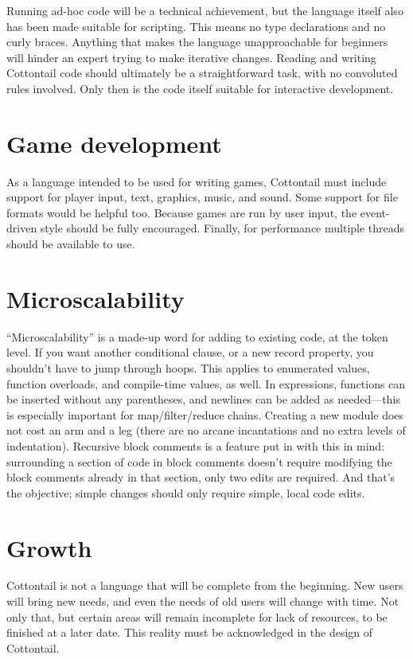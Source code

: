 Running ad-hoc code will be a technical achievement, but the language
itself also has been made suitable for scripting. This means no type
declarations and no curly braces. Anything that makes the language
unapproachable for beginners will hinder an expert trying to make
iterative changes. Reading and writing Cottontail code should
ultimately be a straightforward task, with no convoluted rules
involved. Only then is the code itself suitable for interactive
development.


\section{Game development}

As a language intended to be used for writing games, Cottontail must
include support for player input, text, graphics, music, and sound.
Some support for file formats would be helpful too. Because games are
run by user input, the event-driven style should be fully encouraged.
Finally, for performance multiple threads should be available to use.


\section{Microscalability}

``Microscalability'' is a made-up word for adding to existing code, at
the token level. If you want another conditional clause, or a new
record property, you shouldn't have to jump through hoops. This
applies to enumerated values, function overloads, and compile-time
values, as well. In expressions, functions can be inserted without any
parentheses, and newlines can be added as needed---this is especially
important for map/filter/reduce chains. Creating a new module does not
cost an arm and a leg (there are no arcane incantations and no extra
levels of indentation). Recursive block comments is a feature put in
with this in mind: surrounding a section of code in block comments
doesn't require modifying the block comments already in that section,
only two edits are required. And that's the objective; simple changes
should only require simple, local code edits.


\section{Growth}

Cottontail is not a language that will be complete from the beginning.
New users will bring new needs, and even the needs of old users will
change with time. Not only that, but certain areas will remain
incomplete for lack of resources, to be finished at a later date. This
reality must be acknowledged in the design of Cottontail.

